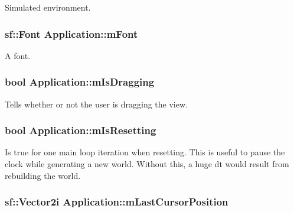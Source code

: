 Simulated environment. 

\hypertarget{class_application_a697d840b0ef9b447a9463996d5963e10}{
\subsubsection[{m\-Font}]{\setlength{\rightskip}{0pt plus 5cm}sf\-::\-Font Application\-::m\-Font\hspace{0.3cm}{\ttfamily [private]}}}\label{class_application_a697d840b0ef9b447a9463996d5963e10}


A font. 

\hypertarget{class_application_a2d1510e1159955e12660faf4ad1230a0}{
\subsubsection[{m\-Is\-Dragging}]{\setlength{\rightskip}{0pt plus 5cm}bool Application\-::m\-Is\-Dragging\hspace{0.3cm}{\ttfamily [private]}}}\label{class_application_a2d1510e1159955e12660faf4ad1230a0}


Tells whether or not the user is dragging the view. 

\hypertarget{class_application_a2e3fd7543cf6e9a1da9940b60c512456}{
\subsubsection[{m\-Is\-Resetting}]{\setlength{\rightskip}{0pt plus 5cm}bool Application\-::m\-Is\-Resetting\hspace{0.3cm}{\ttfamily [private]}}}\label{class_application_a2e3fd7543cf6e9a1da9940b60c512456}
Is true for one main loop iteration when resetting. This is useful to pause the clock while generating a new world. Without this, a huge dt would result from rebuilding the world. \hypertarget{class_application_a26c9135cd4290fbd7619f58f1a0c602b}{
\subsubsection[{m\-Last\-Cursor\-Position}]{\setlength{\rightskip}{0pt plus 5cm}sf\-::\-Vector2i Application\-::m\-Last\-Cursor\-Position\hspace{0.3cm}{\ttfamily [private]}}}\label{class_application_a26c9135cd4290fbd7619f58f1a0c602b}



